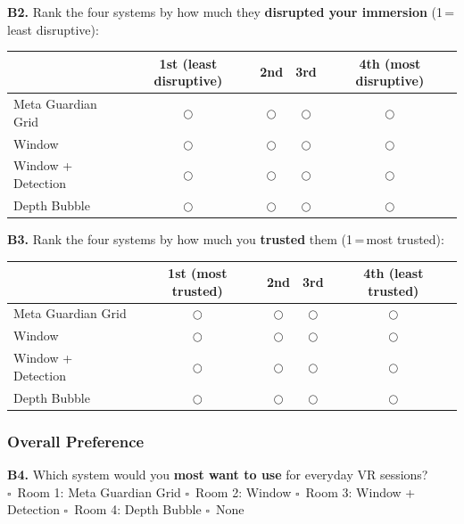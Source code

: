 \documentclass{styling/vgtc} %
\begin{document}
\medskip
\noindent\textbf{B2.} Rank the four systems by how much they \textbf{disrupted your immersion} (1\,=\,least disruptive):

\smallskip
\begin{center}
\begin{tabular}{@{}lcccc@{}}
\toprule
 & \textbf{1st (least disruptive)} & \textbf{2nd} & \textbf{3rd} & \textbf{4th (most disruptive)} \\
\midrule
Meta Guardian Grid & $\bigcirc$ & $\bigcirc$ & $\bigcirc$ & $\bigcirc$ \\
Window             & $\bigcirc$ & $\bigcirc$ & $\bigcirc$ & $\bigcirc$ \\
Window + Detection & $\bigcirc$ & $\bigcirc$ & $\bigcirc$ & $\bigcirc$ \\
Depth Bubble       & $\bigcirc$ & $\bigcirc$ & $\bigcirc$ & $\bigcirc$ \\
\bottomrule
\end{tabular}
\end{center}

\medskip
\noindent\textbf{B3.} Rank the four systems by how much you \textbf{trusted} them (1\,=\,most trusted):

\smallskip
\begin{center}
\begin{tabular}{@{}lcccc@{}}
\toprule
 & \textbf{1st (most trusted)} & \textbf{2nd} & \textbf{3rd} & \textbf{4th (least trusted)} \\
\midrule
Meta Guardian Grid & $\bigcirc$ & $\bigcirc$ & $\bigcirc$ & $\bigcirc$ \\
Window             & $\bigcirc$ & $\bigcirc$ & $\bigcirc$ & $\bigcirc$ \\
Window + Detection & $\bigcirc$ & $\bigcirc$ & $\bigcirc$ & $\bigcirc$ \\
Depth Bubble       & $\bigcirc$ & $\bigcirc$ & $\bigcirc$ & $\bigcirc$ \\
\bottomrule
\end{tabular}
\end{center}

\bigskip
\subsubsection*{Overall Preference}

\noindent\textbf{B4.} Which system would you \textbf{most want to use} for everyday VR sessions?\\[6pt]
$\square$~Room 1: Meta Guardian Grid\quad
$\square$~Room 2: Window\quad
$\square$~Room 3: Window + Detection\quad
$\square$~Room 4: Depth Bubble\quad
$\square$~None
\end{document}
